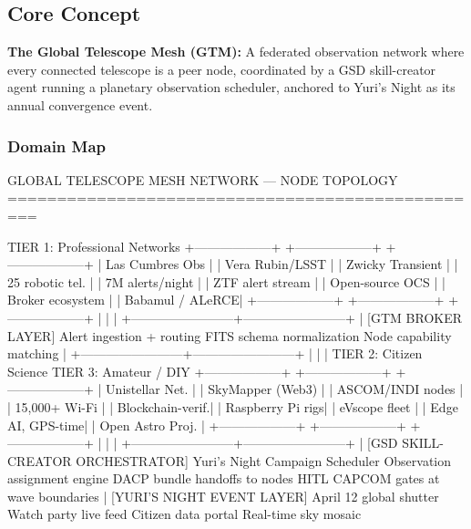 \documentclass[11pt,letterpaper]{article}
\begin{document}
\subsection{Core Concept}

\textbf{The Global Telescope Mesh (GTM):} A federated observation network where every connected telescope is a peer node, coordinated by a GSD skill-creator agent running a planetary observation scheduler, anchored to Yuri's Night as its annual convergence event.

\subsubsection{Domain Map}

\begin{asciibox}
GLOBAL TELESCOPE MESH NETWORK --- NODE TOPOLOGY
=================================================

  TIER 1: Professional Networks
  +------------------+     +------------------+     +------------------+
  | Las Cumbres Obs  |     | Vera Rubin/LSST  |     | Zwicky Transient |
  | 25 robotic tel.  |     | 7M alerts/night  |     | ZTF alert stream |
  | Open-source OCS  |     | Broker ecosystem |     |  Babamul / ALeRCE|
  +------------------+     +------------------+     +------------------+
           |                        |                        |
           +------------------------+------------------------+
                                    |
                            [GTM BROKER LAYER]
                         Alert ingestion + routing
                         FITS schema normalization
                         Node capability matching
                                    |
           +------------------------+------------------------+
           |                        |                        |
  TIER 2: Citizen Science       TIER 3: Amateur / DIY
  +------------------+     +------------------+     +------------------+
  | Unistellar Net.  |     | SkyMapper (Web3) |     | ASCOM/INDI nodes |
  | 15,000+ Wi-Fi    |     | Blockchain-verif.|     | Raspberry Pi rigs|
  | eVscope fleet    |     | Edge AI, GPS-time|     | Open Astro Proj. |
  +------------------+     +------------------+     +------------------+
           |                        |                        |
           +------------------------+------------------------+
                                    |
                    [GSD SKILL-CREATOR ORCHESTRATOR]
                  Yuri's Night Campaign Scheduler
                  Observation assignment engine
                  DACP bundle handoffs to nodes
                  HITL CAPCOM gates at wave boundaries
                                    |
                          [YURI'S NIGHT EVENT LAYER]
                          April 12 global shutter
                          Watch party live feed
                          Citizen data portal
                          Real-time sky mosaic
\end{asciibox}
\end{document}

